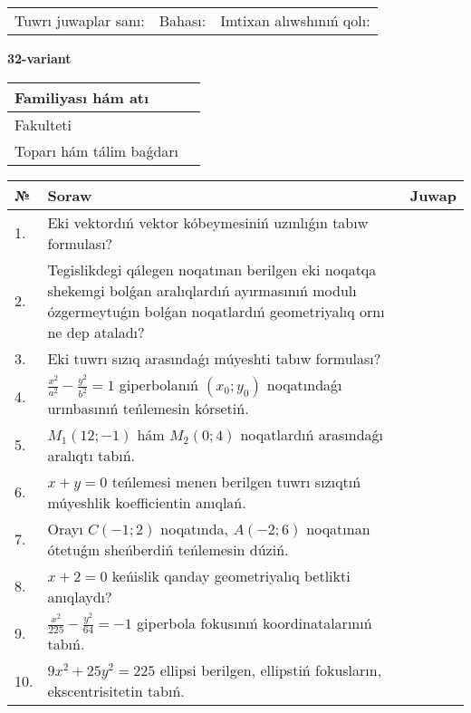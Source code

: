 \documentclass{article}
\begin{document}
\vspace{1cm}

\begin{tabular}{lll}
Tuwrı juwaplar sanı: \underline{\hspace{1.5cm}} & 
Bahası: \underline{\hspace{1.5cm}} & 
Imtixan alıwshınıń qolı: \underline{\hspace{2cm}} \\
\end{tabular}

\egroup

\newpage


\textbf{32-variant}\\

\bgroup
\def\arraystretch{1.6} %

\begin{tabular}{|m{5.7cm}|m{9.5cm}|}
\hline
Familiyası hám atı & \\
\hline
Fakulteti  & \\
\hline
Toparı hám tálim baǵdarı  & \\
\hline
\end{tabular}

\vspace{1cm}

\begin{tabular}{|m{0.7cm}|m{10cm}|m{4cm}|}
\hline
№ & Soraw & Juwap \\
\hline
1. & Eki vektordıń vektor kóbeymesiniń uzınlıǵın tabıw formulası? &  \\
\hline
2. & Tegislikdegi qálegen noqatınan berilgen eki noqatqa shekemgi bolǵan aralıqlardıń ayırmasınıń modulı ózgermeytuǵın bolǵan noqatlardıń geometriyalıq ornı ne dep ataladı? &  \\
\hline
3. & Eki tuwrı sızıq arasındaǵı múyeshti tabıw formulası? &  \\
\hline
4. & $\frac{x^2}{a^2}-\frac{y^2}{b^2}=1$ giperbolanıń $(x_0;y_0)$ noqatındaǵı urınbasınıń teńlemesin kórsetiń. &  \\
\hline
5. & $M_{1} (12;-1)$ hám $M_{2} (0;4)$ noqatlardıń arasındaǵı aralıqtı tabıń. &  \\
\hline
6. & $x+y=0$ teńlemesi menen berilgen tuwrı sızıqtıń múyeshlik koefficientin anıqlań. &  \\
\hline
7. & Orayı $C (-1;2)$ noqatında, $A (-2;6 )$ noqatınan ótetuǵın sheńberdiń teńlemesin dúziń. &  \\
\hline
8. & $x+2=0$ keńislik qanday geometriyalıq betlikti anıqlaydı? &  \\
\hline
9. & $\frac{x^{2}}{225}-\frac{y^{2}}{64}=-1$ giperbola fokusınıń koordinatalarınıń tabıń. &  \\
\hline
10. & $9x^{2}+25y^{2}=225$ ellipsi berilgen, ellipstiń fokusların, ekscentrisitetin tabıń. &  \\
\hline
\end{tabular}
\end{document}
